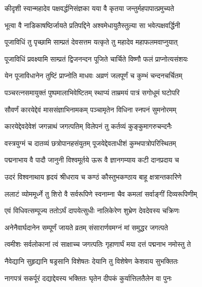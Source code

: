 \twolineshloka
{कीदृशी स्यान्महादेव पक्षवर्द्धनिसंज्ञका}
{यया वै कृतया जन्तुर्महपापात्प्रमुच्यते}%



\twolineshloka
{भूत्वा वै नाडिकाषष्ठिर्जायते प्रतिपद्दिने}
{अश्वमेधायुतैस्तुल्या सा भवेत्पक्षवर्द्धिनी}%


\twolineshloka
{पूजाविधिं तु पृच्छामि साम्प्रतं देवसत्तम}
{यत्कृते तु महादेव महाफलमवाप्नुयात्}%


\twolineshloka
{पूजाविधिं प्रवक्ष्यामि साम्प्रतं द्विजनन्दन}
{पूजिते चार्चिते विष्णौ फलं प्राप्नोत्यसंशयः}%

\twolineshloka
{येन पूजाविधानेन तुष्टिं प्राप्नोति माधवः}
{अव्रणं जलपूर्णं च कुम्भं चन्दनचर्चितम्}%

\twolineshloka
{पञ्चरत्नसमायुक्तं पुष्पमालाभिवेष्टितम्}
{स्थाप्यं ताम्रमयं पात्रं सगोधूमं घटोपरि}%

\twolineshloka
{सौवर्णं कारयेद्देवं माससंज्ञाभिनामकम्}
{पञ्चामृतेन विधिना स्नपनं सुमनोरमम्}%

\twolineshloka
{कारयेद्देवदेवेशं जगन्नाथं जगत्पतिम्}
{विलेपनं तु कर्तव्यं कुङ्कुमागरुचन्दनैः}%

\twolineshloka
{वस्त्रयुग्मं च दातव्यं छत्रोपानहसंयुतम्}
{पूजयेद्देवताधीशं कुम्भपात्रोपरिस्थितम्}%

\twolineshloka
{पद्मनाभाय वै पादौ जानुनी विश्वमूर्तये}
{ऊरू वै ज्ञानगम्याय कटी दानप्रदाय च}%

\twolineshloka
{उदरं विश्वनाथाय हृदयं श्रीधराय च}
{कण्ठं कौस्तुभकण्ठाय बाहू क्षत्रान्तकारिणे}%

\twolineshloka
{ललाटं व्योममूर्ध्ने तु शिरो वै सर्वरूपिणे}
{स्वनाम्ना चैव कमलां सर्वाङ्गीं दिव्यरूपिणीम्}%

\twolineshloka
{एवं विधिवत्सम्पूज्य ततोऽर्घं दापयेत्सुधीः}
{नालिकेरेण शुभ्रेण देवदेवस्य चक्रिणः}%

\twolineshloka
{अनेनैवार्घदानेन सम्पूर्णं जायते व्रतम्}
{संसारार्णवमग्नं मां समुद्धर जगत्पते}%

\twolineshloka
{त्वमीशः सर्वलोकानां त्वं साक्षाच्च जगत्पतिः}
{गृहाणार्घं मया दत्तं पद्मनाभ नमोस्तु ते}%

\twolineshloka
{नैवेद्यानि सुहृद्यानि षड्रसानि विशेषतः}
{देयानि तु विशेषेण केशवाय सुभक्तितः}%

\twolineshloka
{नागपत्रं सकर्पूरं दद्याद्देवस्य भक्तितः}
{घृतेन दीपकं कुर्यात्तिलतैलेन वा पुनः}%

